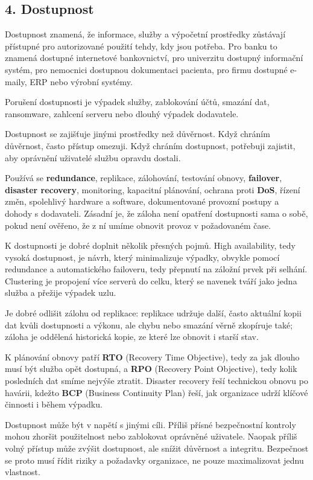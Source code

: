\subsection*{4. Dostupnost}

Dostupnost znamená, že informace, služby a výpočetní prostředky zůstávají přístupné pro autorizované použití tehdy, kdy jsou potřeba. Pro banku to znamená dostupné internetové bankovnictví, pro univerzitu dostupný informační systém, pro nemocnici dostupnou dokumentaci pacienta, pro firmu dostupné e- maily, ERP nebo výrobní systémy.

Porušení dostupnosti je výpadek služby, zablokování účtů, smazání dat, ransomware, zahlcení serveru nebo dlouhý výpadek dodavatele.

Dostupnost se zajišťuje jinými prostředky než důvěrnost. Když chráním důvěrnost, často přístup omezuji. Když chráním dostupnost, potřebuji zajistit, aby oprávnění uživatelé službu opravdu dostali.

Používá se \textbf{redundance}, replikace, zálohování, testování obnovy, \textbf{failover}, \textbf{disaster recovery}, monitoring, kapacitní plánování, ochrana proti \textbf{DoS}, řízení změn, spolehlivý hardware a software, dokumentované provozní postupy a dohody s dodavateli. Zásadní je, že záloha není opatření dostupnosti sama o sobě, pokud není ověřeno, že z ní umíme obnovit provoz v požadovaném čase.

K dostupnosti je dobré doplnit několik přesných pojmů. High availability, tedy vysoká dostupnost, je návrh, který minimalizuje výpadky, obvykle pomocí redundance a automatického failoveru, tedy přepnutí na záložní prvek při selhání. Clustering je propojení více serverů do celku, který se navenek tváří jako jedna služba a přežije výpadek uzlu.

Je dobré odlišit zálohu od replikace: replikace udržuje další, často aktuální kopii dat kvůli dostupnosti a výkonu, ale chybu nebo smazání věrně zkopíruje také; záloha je oddělená historická kopie, ze které lze obnovit i starší stav.

K plánování obnovy patří \textbf{RTO} (Recovery Time Objective), tedy za jak dlouho musí být služba opět dostupná, a \textbf{RPO} (Recovery Point Objective), tedy kolik posledních dat smíme nejvýše ztratit. Disaster recovery řeší technickou obnovu po havárii, kdežto \textbf{BCP} (Business Continuity Plan) řeší, jak organizace udrží klíčové činnosti i během výpadku.

Dostupnost může být v napětí s jinými cíli. Příliš přísné bezpečnostní kontroly mohou zhoršit použitelnost nebo zablokovat oprávněné uživatele. Naopak příliš volný přístup může zvýšit dostupnost, ale snížit důvěrnost a integritu. Bezpečnost se proto musí řídit riziky a požadavky organizace, ne pouze maximalizovat jednu vlastnost.

